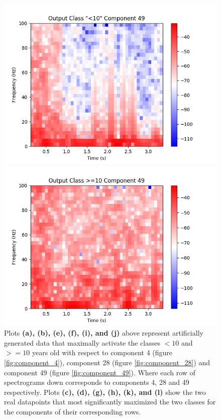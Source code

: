 \documentclass[fleqn,10pt]{wlscirep}
\begin{document}
\begin{figure}[t!]
\begin{minipage}{0.24\textwidth}
    \includegraphics[width=\linewidth]{max_act/real_0_49.png}
    \subcaption{}
  \end{minipage}
  \hspace*{\fill} 
  \begin{minipage}{0.24\textwidth}
    \includegraphics[width=\linewidth]{max_act/real_1_49.png}
    \subcaption{}
  \end{minipage}
  \caption{Plots \textbf{(a), (b), (e), (f), (i), and (j)} above represent artificially generated data that maximally activate the classes $<10$ and $>=10$ years old with respect to component 4 (figure \ref{fig:component_4}), component 28 (figure \ref{fig:component_28}) and component 49 (figure \ref{fig:component_49}). Where each row of spectrograms down corresponds to components 4, 28 and 49 respectively. Plots \textbf{(c), (d), (g), (h), (k), and (l)} show the two real datapoints that most significantly maximized the two classes for the components of their corresponding rows.} \label{fig:max_spectrograms}
\end{figure}
\end{document}

